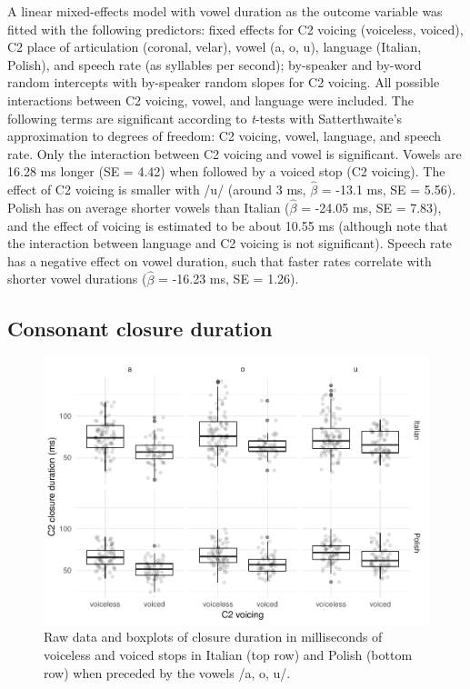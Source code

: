 \documentclass[12pt,]{article}
\begin{document}
A linear mixed-effects model with vowel duration as the outcome variable
was fitted with the following predictors: fixed effects for C2 voicing
(voiceless, voiced), C2 place of articulation (coronal, velar), vowel
(a, o, u), language (Italian, Polish), and speech rate (as syllables per
second); by-speaker and by-word random intercepts with by-speaker random
slopes for C2 voicing. All possible interactions between C2 voicing,
vowel, and language were included. The following terms are significant
according to \emph{t}-tests with Satterthwaite's approximation to
degrees of freedom: C2 voicing, vowel, language, and speech rate. Only
the interaction between C2 voicing and vowel is significant. Vowels are
16.28 ms longer (SE = 4.42) when followed by a voiced stop (C2 voicing).
The effect of C2 voicing is smaller with /u/ (around 3 ms,
\(\hat{\beta}\) = -13.1 ms, SE = 5.56). Polish has on average shorter
vowels than Italian (\(\hat{\beta}\) = -24.05 ms, SE = 7.83), and the
effect of voicing is estimated to be about 10.55 ms (although note that
the interaction between language and C2 voicing is not significant).
Speech rate has a negative effect on vowel duration, such that faster
rates correlate with shorter vowel durations (\(\hat{\beta}\) = -16.23
ms, SE = 1.26).

\hypertarget{consonant-closure-duration}{%
\subsection{Consonant closure
duration}\label{consonant-closure-duration}}

\label{s:cduration}

\begin{figure}
\includegraphics[width=\linewidth]{2018-relrel_files/figure-latex/Figure3} \caption{Raw data and boxplots of closure duration in milliseconds of voiceless and voiced stops in Italian (top row) and Polish (bottom row) when preceded by the vowels /a, o, u/.}\label{f:Figure3}
\end{figure}
\end{document}
